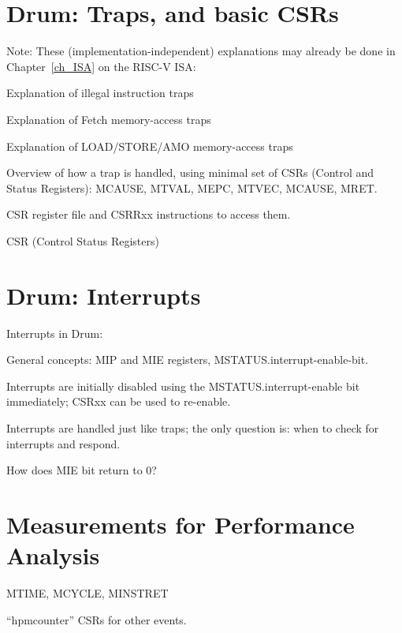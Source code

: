 
\section{Drum: Traps, and basic CSRs}

Note: These (implementation-independent) explanations may already be
done in Chapter~\ref{ch_ISA} on the RISC-V ISA:

\begin{tightlist}
  \item Explanation of illegal instruction traps
  \item Explanation of Fetch memory-access traps
  \item Explanation of LOAD/STORE/AMO memory-access traps
\end{tightlist}

Overview of how a trap is handled, using minimal set of CSRs (Control
and Status Registers): MCAUSE, MTVAL, MEPC, MTVEC, MCAUSE, MRET.

CSR register file and CSRRxx instructions to access them.

CSR (Control Status Registers)


\section{Drum: Interrupts}

Interrupts in Drum:
\begin{tightlist}
  \item General concepts: MIP and MIE registers, MSTATUS.interrupt-enable-bit.

  \item Interrupts are initially disabled using the
        MSTATUS.interrupt-enable bit immediately; CSRxx can be used to
        re-enable.

  \item Interrupts are handled just like traps; the only question is:
        when to check for interrupts and respond.

  \item How does MIE bit return to 0?

\end{tightlist}


\section{Measurements for Performance Analysis}

MTIME, MCYCLE, MINSTRET

``hpmcounter'' CSRs for other events.

